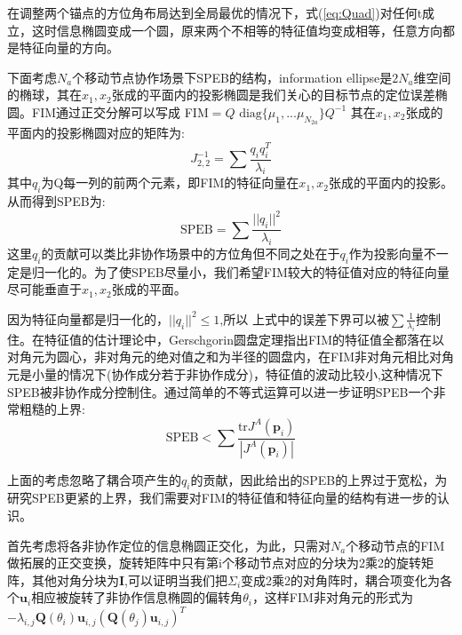 \documentclass[12pt]{article}
\theoremstyle{remark}
\begin{document}
在调整两个锚点的方位角布局达到全局最优的情况下，式(\ref{eq:Quad})对任何t成立，这时信息椭圆变成一个圆，原来两个不相等的特征值均变成相等，任意方向都是特征向量的方向。

下面考虑$N_a$个移动节点协作场景下SPEB的结构，information ellipse是$2N_a$维空间的椭球，其在$x_1,x_2$张成的平面内的投影椭圆是我们关心的目标节点的定位误差椭圆。FIM通过正交分解可以写成
FIM$=Q\text{ diag}\{\mu_1,...\mu_{N_{2a}}\}Q^{-1}$
其在$x_1,x_2$张成的平面内的投影椭圆对应的矩阵为:
\begin{equation}
J^{-1}_{2,2}=\sum \frac{q_iq_i^T}{\lambda_i}
\end{equation}
其中$q_i$为Q每一列的前两个元素，即FIM的特征向量在$x_1,x_2$张成的平面内的投影。
从而得到SPEB为:
\begin{equation}
\text{SPEB}=\sum \frac{||q_i||^2}{\lambda_i}
\end{equation}
这里$q_i$的贡献可以类比非协作场景中的方位角但不同之处在于$q_i$作为投影向量不一定是归一化的。为了使SPEB尽量小，我们希望FIM较大的特征值对应的特征向量尽可能垂直于$x_1,x_2$张成的平面。

因为特征向量都是归一化的，$||q_i||^2 \leq 1$,所以
上式中的误差下界可以被$\sum \frac{1}{\lambda_i}$控制住。在特征值的估计理论中，Gerschgorin圆盘定理指出FIM的特征值全都落在以对角元为圆心，非对角元的绝对值之和为半径的圆盘内，在FIM非对角元相比对角元是小量的情况下(协作成分若于非协作成分)，特征值的波动比较小,这种情况下SPEB被非协作成分控制住。通过简单的不等式运算可以进一步证明SPEB一个非常粗糙的上界:
\begin{equation}
\text{SPEB}<\sum \frac{\text{tr}J^A(\bm{p}_{i})}{|J^A(\bm{p}_{i})|}
\end{equation}

上面的考虑忽略了耦合项产生的$q_i$的贡献，因此给出的SPEB的上界过于宽松，为研究SPEB更紧的上界，我们需要对FIM的特征值和特征向量的结构有进一步的认识。

首先考虑将各非协作定位的信息椭圆正交化，为此，只需对$N_a$个移动节点的FIM做拓展的正交变换，旋转矩阵中只有第i个移动节点对应的分块为2乘2的旋转矩阵，其他对角分块为$\bm{I}$,可以证明当我们把$\Sigma_i$变成2乘2的对角阵时，耦合项变化为各个$\bm{u}_i$相应被旋转了非协作信息椭圆的偏转角$\theta_i$，这样FIM非对角元的形式为$-\lambda_{i,j}\bm{Q}(\theta_i)\bm{u}_{i,j}(\bm{Q}(\theta_j)\bm{u}_{i,j})^T$
\end{document}
